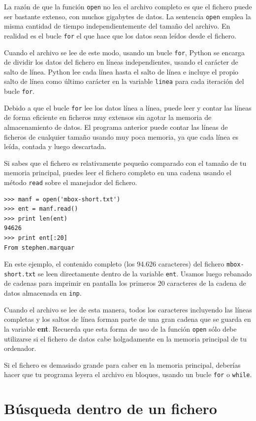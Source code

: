 La razón de que la función {\tt open} no lea el archivo completo
es que el fichero puede ser bastante extenso, con muchos gigabytes de datos.
La sentencia {\tt open} emplea la misma cantidad de tiempo independientemente del
tamaño del archivo. En realidad es el bucle {\tt for} el que hace que
los datos sean leídos desde el fichero.

Cuando el archivo se lee de este modo, usando un bucle {\tt for}, Python
se encarga de dividir los datos del fichero en líneas independientes, usando
el carácter de salto de línea. Python lee cada línea hasta el
salto de línea e incluye
el propio salto de línea como último carácter en la variable {\tt linea} para
cada iteración del bucle {\tt for}.

Debido a que el bucle {\tt for} lee los datos línea a línea, puede
leer y contar las líneas de forma eficiente en ficheros muy extensos sin
agotar la memoria de almacenamiento de datos. El programa anterior puede
contar las líneas de ficheros de cualquier tamaño usando muy poca memoria,
ya que cada línea es leída, contada y luego descartada.

Si sabes que el fichero es relativamente pequeño comparado con el tamaño de
tu memoria principal, puedes leer el fichero completo en una cadena
usando el método {\tt read} sobre el manejador del fichero.

\beforeverb
\begin{verbatim}
>>> manf = open('mbox-short.txt')
>>> ent = manf.read()
>>> print len(ent)
94626
>>> print ent[:20]
From stephen.marquar
\end{verbatim}
\afterverb
%
En este ejemplo, el contenido completo (los 94.626 caracteres)
del fichero {\tt mbox-short.txt} se leen directamente dentro de la variable
{\tt ent}. Usamos luego rebanado de cadenas para imprimir en pantalla
los primeros 20 caracteres de la cadena de datos almacenada en {\tt inp}.

Cuando el archivo se lee de esta manera, todos los caracteres incluyendo
las líneas completas y los saltos de línea forman parte de una gran cadena
que se guarda en la variable {\bf ent}.
Recuerda que esta forma de uso de la función {\tt open} sólo debe utilizarse
si el fichero de datos cabe holgadamente en la memoria principal
de tu ordenador.

Si el fichero es demasiado grande para caber en la memoria principal, deberías
hacer que tu programa leyera el archivo en bloques, usando un bucle
{\tt for} o {\tt while}.

\section{Búsqueda dentro de un fichero}

